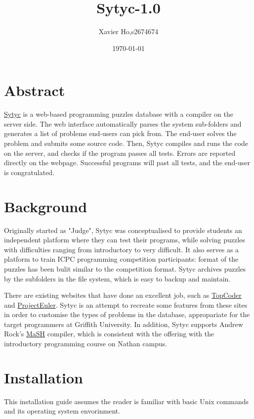 \documentclass[a4paper]{article}
\title{Sytyc-1.0}
\author{Xavier Ho,\quad s2674674}
\date{\today}
\begin{document}
\maketitle

\section*{\centering \small Abstract}

\href{https://github.com/SpaXe/Sytyc}{Sytyc} is a web-based programming puzzles database with a compiler on the server side.  The web interface automatically parses the system sub-folders and generates a list of problems end-users can pick from.  The end-user solves the problem and submits some source code.  Then, Sytyc compiles and runs the code on the server, and checks if the program passes all tests.  Errors are reported directly on the webpage.  Successful programs will past all tests, and the end-user is congratulated.

\section{Background}

Originally started as "Judge", Sytyc was conceptualised to provide students an independent platform where they can test their programs, while solving puzzles with difficulties ranging from introductory to very difficult.  It also serves as a platform to train ICPC programming competition participants: format of the puzzles has been bulit similar to the competition format.  Sytyc archives puzzles by the subfolders in the file system, which is easy to backup and maintain.

There are existing websites that have done an excellent job, such as \href{http://www.topcoder.com/}{TopCoder} and \href{http://projecteuler.net/}{ProjectEuler}.  Sytyc is an attempt to recreate some features from these sites in order to customise the types of problems in the database, appropariate for the target programmers at Griffith University.  In addition, Sytyc supports Andrew Rock's \href{http://www.ict.griffith.edu.au/arock/MaSH/index.html}{MaSH} compiler, which is consistent with the offering with the introductory programming course on Nathan campus.

\section{Installation}

This installation guide assumes the reader is familiar with basic Unix commands and its operating system envorinment.
\end{document}
